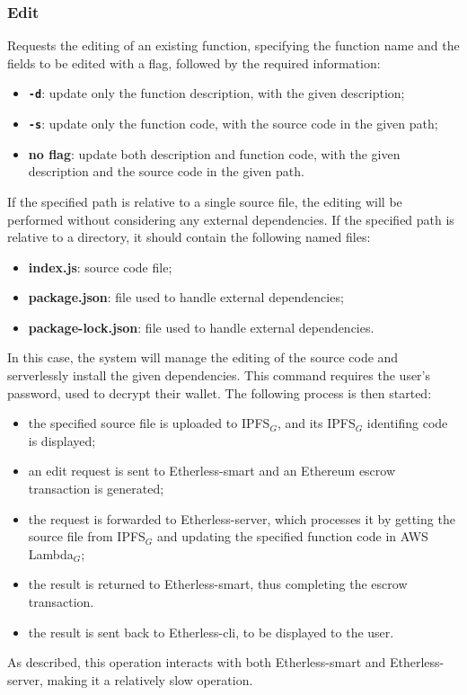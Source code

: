 	\subsubsection{Edit}
	Requests the editing of an existing function, specifying the function name and the fields to be edited with a flag, followed by the required information:
	\begin{itemize}
		\item \textbf{\texttt{-d}}: update only the function description, with the given description;
		\item \textbf{\texttt{-s}}: update only the function code, with the source code in the given path;
		\item \textbf{no flag}: update both description and function code, with the given description and the source code in the given path.
	\end{itemize}
	If the specified path is relative to a single source file, the editing will be performed without considering any external dependencies. If the specified path is relative to a directory, it should contain the following named files:
	\begin{itemize}
		\item \textbf{index.js}: source code file;
		\item \textbf{package.json}: file used to handle external dependencies;
		\item \textbf{package-lock.json}: file used to handle external dependencies.
	\end{itemize}
	In this case, the system will manage the editing of the source code and serverlessly install the given dependencies. This command requires the user's password, used to decrypt their wallet. The following process is then started:
	\begin{itemize}
		\item the specified source file is uploaded to IPFS$_{G}$, and its IPFS$_{G}$ identifing code is displayed;
		\item an edit request is sent to Etherless-smart and an Ethereum escrow transaction is generated;
		\item the request is forwarded to Etherless-server, which processes it by getting the source file from IPFS$_{G}$ and updating the specified function code in AWS Lambda$_{G}$;
		\item the result is returned to Etherless-smart, thus completing the escrow transaction.
		\item the result is sent back to Etherless-cli, to be displayed to the user.
	\end{itemize}
	As described, this operation interacts with both Etherless-smart and Etherless-server, making it a relatively slow operation.
